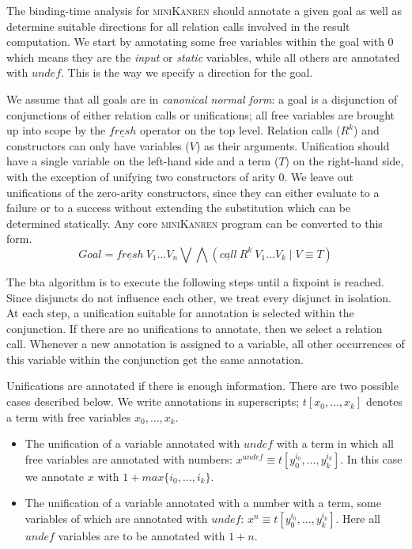 \documentclass[submission,copyright,creativecommons]{eptcs}
\newcommand{\miniKanren}{\textsc{miniKanren}}
\newcommand\undef{unde\!f}
\newcommand\fresh{f\!resh}
\begin{document}
The binding-time analysis for \miniKanren{} should annotate a given goal as well as determine suitable directions for all relation calls involved in the result computation.
We start by annotating some free variables within the goal with $0$ which means they are the \emph{input} or \emph{static} variables, while all others are annotated with $\undef{}$.
This is the way we specify a direction for the goal.

We assume that all goals are in \emph{canonical normal form}: a goal is a disjunction of conjunctions of either relation calls or unifications; all free variables are brought up into scope by the $\underline{\fresh{}}$ operator on the top level.
Relation calls ($R^k$) and constructors can only have variables ($V$) as their arguments. Unification should have a single variable on the left-hand side and a term ($T$) on the right-hand side, with the exception of unifying two constructors of arity $0$.
We leave out unifications of the zero-arity constructors, since they can either evaluate to a failure or to a success without extending the substitution which can be determined statically.
Any core \miniKanren{} program can be converted to this form.
$$Goal = \underline{\fresh{}} \ V_1 \dots V_n \bigvee \bigwedge (\underline{call} \ R^k \ V_1 \dots V_k \mid V \equiv T)$$

The bta algorithm is to execute the following steps until a fixpoint is reached.
Since disjuncts do not influence each other, we treat every disjunct in isolation.
At each step, a unification suitable for annotation is selected within the conjunction.
If there are no unifications to annotate, then we select a relation call.
Whenever a new annotation is assigned to a variable, all other occurrences of this variable within the conjunction get the same annotation.

Unifications are annotated if there is enough information.
There are two possible cases described below.
We write annotations in superscripts; $t[x_0, \dots, x_k]$ denotes a term with free variables $x_0, \dots, x_k$.
\begin{itemize}
  \item The unification of a variable annotated with $\undef{}$ with a term in which all free variables are annotated with numbers: $x^{\undef{}} \equiv t[y_0^{i_0},\dots, y_k^{i_k}]$. In this case we annotate $x$ with $1+max\{i_0,\dots,i_k\}$.
  \item The unification of a variable annotated with a number with a term, some variables of which are annotated with $\undef{}$: $x^{n} \equiv t[y_0^{i_0},\dots, y_k^{i_k}]$. Here all $\undef{}$ variables are to be annotated with $1+n$.
\end{itemize}
\end{document}
